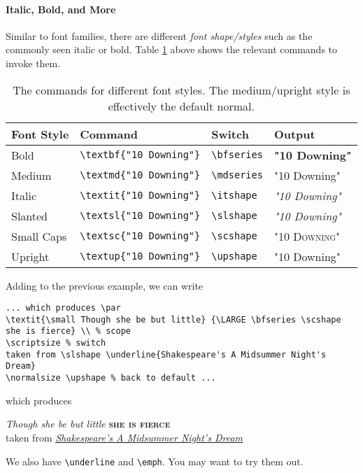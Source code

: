 \paragraph{Italic, Bold, and More}
Similar to font families, there are different \textit{font shape/\allowbreak styles} such as the commonly seen italic or bold. Table \ref{tab:fontshape} above shows the relevant commands to invoke them.
\begin{table}
\begin{tabularx}{\textwidth}{|l|X|l|l|}
\hline
Font Style & Command & Switch & Output \\
\hline
Bold & \texttt{\textbackslash textbf\{"10 Downing"\}}& \texttt{\textbackslash bfseries} & \textbf{"10 Downing"} \\
\hline
Medium & \texttt{\textbackslash textmd\{"10 Downing"\}}& \texttt{\textbackslash mdseries} & \textmd{"10 Downing"} \\
\hline
Italic & \texttt{\textbackslash textit\{"10 Downing"\}}& \texttt{\textbackslash itshape} & \textit{"10 Downing"} \\
\hline
Slanted & \texttt{\textbackslash textsl\{"10 Downing"\}}& \texttt{\textbackslash slshape} & \textsl{"10 Downing"} \\
\hline
Small Caps & \texttt{\textbackslash textsc\{"10 Downing"\}}& \texttt{\textbackslash scshape} & \textsc{"10 Downing"} \\
\hline
Upright & \texttt{\textbackslash textup\{"10 Downing"\}}& \texttt{\textbackslash upshape} & \textup{"10 Downing"} \\
\hline
\end{tabularx}
\caption{The commands for different font styles. The medium/upright style is effectively the default normal.}
\label{tab:fontshape}
\end{table}
Adding to the previous example, we can write
\begin{lstlisting}
... which produces \par
\textit{\small Though she be but little} {\LARGE \bfseries \scshape she is fierce} \\ % scope
\scriptsize % switch
taken from \slshape \underline{Shakespeare's A Midsummer Night's Dream}
\normalsize \upshape % back to default ...
\end{lstlisting}
which produces \par
\textit{\small Though she be but little} {\LARGE \bfseries \scshape she is fierce} \\
\scriptsize
taken from \slshape \underline{Shakespeare's A Midsummer Night's Dream}
\normalsize \upshape \par
We also have \texttt{\textbackslash underline} and \texttt{\textbackslash emph}. You may want to try them out.

